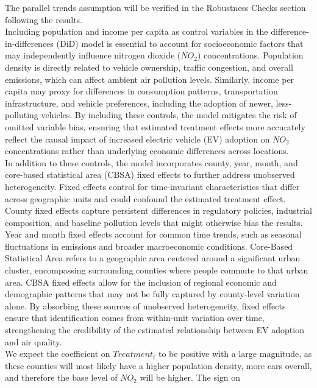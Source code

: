 \documentclass[12pt]{article}
\newcommand\tab[1][.50cm]{\hspace*{#1}}
\begin{document}
	\begin{multicols}{2}
		
		The parallel trends assumption will be verified in the Robustness Checks section following the results.\\ 
		\tab Including population and income per capita as control variables in the difference-in-differences (DiD) model is essential to account for socioeconomic factors that may independently influence nitrogen dioxide ($NO_2$) concentrations. Population density is directly related to vehicle ownership, traffic congestion, and overall emissions, which can affect ambient air pollution levels. Similarly, income per capita may proxy for differences in consumption patterns, transportation infrastructure, and vehicle preferences, including the adoption of newer, less-polluting vehicles. By including these controls, the model mitigates the risk of omitted variable bias, ensuring that estimated treatment effects more accurately reflect the causal impact of increased electric vehicle (EV) adoption on $NO_2$ concentrations rather than underlying economic differences across locations.\\
		\tab In addition to these controls, the model incorporates county, year, month, and core-based statistical area (CBSA) fixed effects to further address unobserved heterogeneity. Fixed effects control for time-invariant characteristics that differ across geographic units and could confound the estimated treatment effect. County fixed effects capture persistent differences in regulatory policies, industrial composition, and baseline pollution levels that might otherwise bias the results. Year and month fixed effects account for common time trends, such as seasonal fluctuations in emissions and broader macroeconomic conditions. Core-Based Statistical Area refers to a geographic area centered around a significant urban cluster, encompassing surrounding counties where people commute to that urban area. CBSA fixed effects allow for the inclusion of regional economic and demographic patterns that may not be fully captured by county-level variation alone. By absorbing these sources of unobserved heterogeneity, fixed effects ensure that identification comes from within-unit variation over time, strengthening the credibility of the estimated relationship between EV adoption and air quality.\\
		\tab We expect the coefficient on 
		$Treatment_i$ to be positive with a large magnitude, as these counties will most likely have a higher population density, more cars overall, and therefore the base level of $NO_2$ will be higher. The sign on 

\end{multicols}
\end{document}
